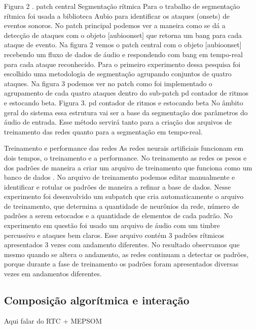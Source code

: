 \documentclass{ppgmus}
\begin{document}
Figura 2 . patch central
 Segmentação rítmica
Para o trabalho de segmentação rítmica foi usada a biblioteca Aubio para identificar os ataques (onsets) de eventos 
sonoros. No patch principal podemos ver a maneira como se dá a detecção de ataques com o objeto [aubioonset\texttildelow] que retorna 
um bang para cada ataque de evento. Na figura 2 vemos o patch central com o objeto  [aubioonset\texttildelow] recebendo um fluxo de 
dados de áudio e respondendo com bang em tempo-real para cada ataque reconhecido.
   Para o primeiro experimento dessa pesquisa foi escolhido uma
metodologia de segmentação agrupando conjuntos de quatro ataques. Na figura 3 podemos ver no patch como foi implementado 
o agrupamento de cada quatro  ataques dentro do sub-patch pd contador de ritmos e estocando beta.
Figura 3. pd contador de ritmos e estocando beta
No âmbito geral do sistema essa estrutura vai ser a base da segmentação dos parâmetros do áudio de entrada. Esse método 
servirá tanto para  a criação dos arquivos de treinamento das redes quanto para a segmentação em tempo-real.

 Treinamento e performance das redes
As redes neurais artificiais funcionam em dois tempos, o treinamento e a performance. No treinamento as redes os pesos e 
dos padrões de maneira a criar um arquivo de treinamento que funciona como um banco de dados . No arquivo de treinamento 
podemos editar manualmente e identificar e rotular os padrões de maneira a refinar a base de dados. Nesse experimento foi 
desenvolvido um subpatch que cria automaticamente o arquivo de treinamento, que determina a quantidade de neurônios da 
rede, número de padrões a serem estocados e a quantidade de elementos de cada padrão.
   No experimento em questão foi usado um arquivo de áudio com um timbre percussivo e ataques bem claros. Esse arquivo 
contém 3 padrões rítmicos apresentados 3 vezes com  andamento diferentes. No resultado observamos que mesmo quando se 
altera o andamento, as redes continuam a detectar os padrões, porque durante a fase de treinamento os padrões foram 
apresentados diversas vezes em andamentos diferentes.






\subsection{Composição algorítmica e interação}



Aqui falar do RTC + MEPSOM
\end{document}
